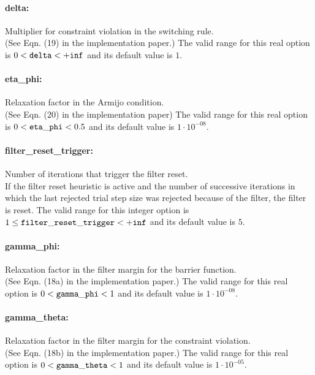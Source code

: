 \paragraph{delta:}\label{sec:delta} Multiplier for constraint violation in the switching rule. $\;$ \\
 (See Eqn. (19) in the implementation paper.) The valid range for this real option is 
$0 <  {\tt delta } <  {\tt +inf}$
and its default value is $1$.


\paragraph{eta\_phi:}\label{sec:eta_phi} Relaxation factor in the Armijo condition. $\;$ \\
 (See Eqn. (20) in the implementation paper) The valid range for this real option is 
$0 <  {\tt eta\_phi } <  0.5$
and its default value is $1 \cdot 10^{-08}$.


\paragraph{filter\_reset\_trigger:}\label{sec:filter_reset_trigger} Number of iterations that trigger the filter reset. $\;$ \\
 If the filter reset heuristic is active and the
number of successive iterations in which the last
rejected trial step size was rejected because of
the filter, the filter is reset. The valid range for this integer option is
$1 \le {\tt filter\_reset\_trigger } <  {\tt +inf}$
and its default value is $5$.


\paragraph{gamma\_phi:}\label{sec:gamma_phi} Relaxation factor in the filter margin for the barrier function. $\;$ \\
 (See Eqn. (18a) in the implementation paper.) The valid range for this real option is 
$0 <  {\tt gamma\_phi } <  1$
and its default value is $1 \cdot 10^{-08}$.


\paragraph{gamma\_theta:}\label{sec:gamma_theta} Relaxation factor in the filter margin for the constraint violation. $\;$ \\
 (See Eqn. (18b) in the implementation paper.) The valid range for this real option is 
$0 <  {\tt gamma\_theta } <  1$
and its default value is $1 \cdot 10^{-05}$.


